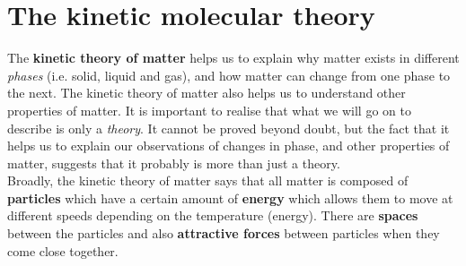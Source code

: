          \section{The kinetic molecular theory}
    \nopagebreak
      \label{m38730*id308618}The \textbf{kinetic theory of matter} helps us to explain why matter exists in different \textsl{phases} (i.e. solid, liquid and gas), and how matter can change from one phase to the next. The kinetic theory of matter also helps us to understand other properties of matter. It is important to realise that what we will go on to describe is only a \textsl{theory}. It cannot be proved beyond doubt, but the fact that it helps us to explain our observations of changes in phase, and other properties of matter, suggests that it probably is more than just a theory.\\
      \label{m38730*id308641}Broadly, the kinetic theory of matter says that all matter is composed of \textbf{particles} which have a certain amount of \textbf{energy} which allows them to move at different speeds depending on the temperature (energy). There are \textbf{spaces} between the particles and also \textbf{attractive forces} between particles when they come close together.

